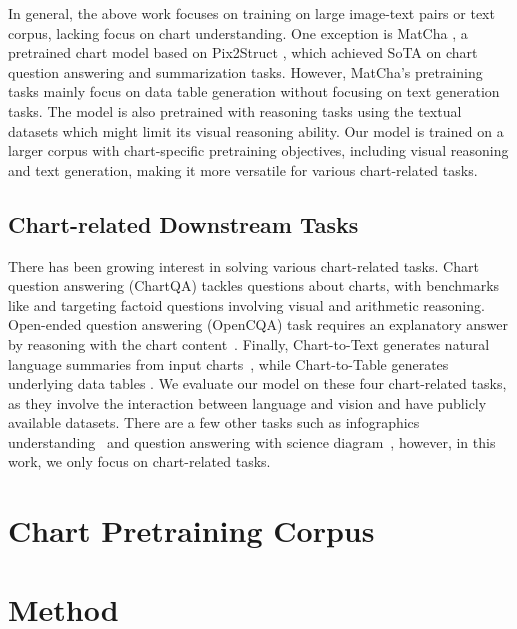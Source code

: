 \documentclass[11pt]{article}
\begin{document}
In general, the above work focuses on training on large image-text pairs or text corpus, lacking focus on chart understanding.
One 
exception is MatCha \cite{liu2022matcha},  
a pretrained chart model based on Pix2Struct \cite{lee2022pix2struct}, which achieved SoTA on chart question answering and summarization tasks. 
However, MatCha's pretraining tasks mainly focus on data table generation 
without focusing on text generation tasks. 
The model is also pretrained with reasoning tasks using the  textual datasets 
which might limit its visual reasoning ability.
Our model is trained on a larger
corpus with chart-specific pretraining objectives, including visual reasoning and text generation, 
making it more versatile for various chart-related tasks.

\vspace{-2mm}
\subsection{Chart-related Downstream Tasks}
 There has been growing interest in solving various chart-related 
 tasks. 
 Chart question answering (ChartQA) tackles questions about charts, with benchmarks like \cite{plotqa} and \cite{masry-etal-2022-chartqa} targeting factoid questions involving visual and arithmetic reasoning. 
 Open-ended question answering (OpenCQA) task requires an explanatory answer by reasoning with the chart content~\cite{open-CQA}. Finally, Chart-to-Text generates natural language summaries from input charts~\cite{chart-to-text-acl}, while Chart-to-Table generates underlying data tables \cite{Choi2019VisualizingFT}.
 We evaluate 
 our model on these four chart-related 
 tasks, as they involve the interaction between language and vision and have publicly available datasets.
 There are a few other 
 tasks  such as infographics understanding~\cite{mathew2022infographicvqa} and question answering with science diagram~\cite{kembhavi2016diagram}, however, in this work, we only focus on chart-related tasks.
 


\vspace{-2mm}
\section{Chart Pretraining Corpus}

\vspace{-2mm}
\section{Method}


\end{document}
